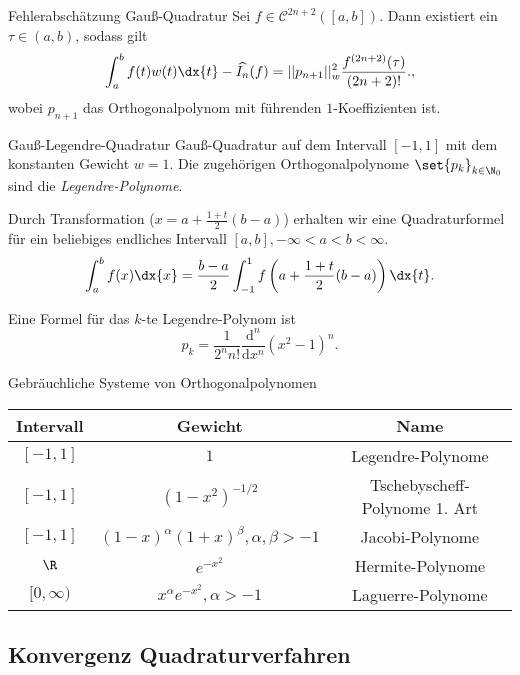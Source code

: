 \begin{karte}{Fehlerabschätzung Gauß-Quadratur}
    Sei \( f \in \mathcal{C}^{2n+2}([a,b]) \). Dann existiert ein \( \tau \in (a,b) \), 
    sodass gilt
    \[ \int_a^b f(t) w(t) \dx{t} - \widehat{I_n}(f) = || p_{n+1} ||_w^2 \frac{ f^{(2n+2)}(\tau) }{ (2n+2)! }.,\]
    wobei \( p_{n+1} \) das Orthogonalpolynom mit führenden \(1\)-Koeffizienten ist.
\end{karte}

\begin{karte}{Gauß-Legendre-Quadratur}
    Gauß-Quadratur auf dem Intervall \( [-1,1] \) mit dem konstanten Gewicht \( w = 1 \).
    Die zugehörigen Orthogonalpolynome \( \set{p_k}_{k\in\N_0} \) sind die \textit{Legendre-Polynome}.

    Durch Transformation (\( x = a + \frac{1+t}{2}(b-a) \)) erhalten wir eine Quadraturformel für ein beliebiges endliches 
    Intervall \( [a,b], -\infty < a < b < \infty \). 
    \[ \int_a^b f(x) \dx{x} = \frac{b-a}{2} \int_{-1}^1 f\left( a + \frac{ 1+t }{2}(b-a) \right) \dx{t}. \]

    Eine Formel für das \(k\)-te Legendre-Polynom ist 
    \[ p_k = \frac{1}{2^n n!} \frac{\mathrm{d}^n}{\mathrm{d}x^n} (x^2 - 1)^n. \]
\end{karte}

\begin{karte}{Gebräuchliche Systeme von Orthogonalpolynomen}
    \begin{center}
    \begin{tabular}{c|c|c}
        Intervall & Gewicht & Name \\\hline
        \( [-1,1] \) & \(1\) & Legendre-Polynome\\[5pt]
        \( [-1,1] \) & \( (1-x^2)^{-1/2} \) & Tschebyscheff-Polynome 1. Art \\[5pt]
        \( [-1,1] \) & \( (1-x)^\alpha (1+x)^\beta, \alpha, \beta > -1 \) & Jacobi-Polynome \\[5pt]
        \( \R \) & \( e^{-x^2} \) & Hermite-Polynome \\[5pt]
        \( [0,\infty) \) & \( x^\alpha e^{-x^2}, \alpha > -1 \) & Laguerre-Polynome
    \end{tabular}
    \end{center}
\end{karte}

\subsection*{Konvergenz Quadraturverfahren}

